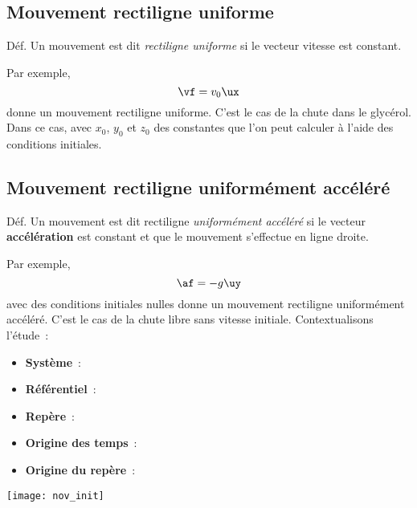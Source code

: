 \documentclass[../main/main.tex]{subfiles}
\begin{document}
\subsection{Mouvement rectiligne uniforme}
\begin{rdefi}{Déf.}
    Un mouvement est dit \textit{rectiligne uniforme} si le vecteur vitesse est
    constant.
\end{rdefi}
Par exemple,
\[\vf = v_0\ux\]
donne un mouvement rectiligne uniforme. C'est le cas de la chute dans le
glycérol. Dans ce cas,
avec $x_0$, $y_0$ et $z_0$ des constantes que l'on peut calculer à l'aide des
conditions initiales.

\subsection{Mouvement rectiligne uniformément accéléré}
\begin{rdefi}{Déf.}
    Un mouvement est dit rectiligne \textit{uniformément accéléré} si le vecteur
    \textbf{accélération} est constant et que le mouvement s'effectue en ligne
    droite.
\end{rdefi}
Par exemple,
\[\af = -g\uy\]
avec des conditions initiales nulles donne un mouvement rectiligne uniformément
accéléré. C'est le cas de la chute libre sans vitesse initiale. Contextualisons
l'étude~: \smallbreak
\begin{minipage}{0.80\linewidth}
    \begin{itemize}
        \item \textbf{Système}~:
        \item \textbf{Référentiel}~:
        \item \textbf{Repère}~:
        \item \textbf{Origine des temps}~:
        \item \textbf{Origine du repère}~:
    \end{itemize}
\end{minipage}
\hfill
\begin{minipage}{0.19\linewidth}
    \begin{center}
        \texttt{[image: nov\_init]}
    \end{center}
\end{minipage}
\end{document}
